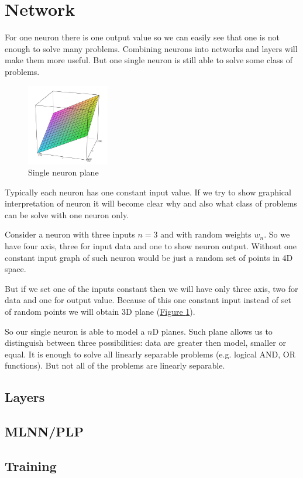 \section{Network}

For one neuron there is one output value so we can easily see that one is not enough to solve many problems. Combining neurons into networks and layers will make them more useful. But one single neuron is still able to solve some class of problems.

\begin{figure}
    \includegraphics[width=0.32\textwidth]{Media/Plane.png}
    \caption{Single neuron plane}
    \label{fig:SingleNeuronPlane}
\end{figure}

Typically each neuron has one constant input value. If we try to show graphical interpretation of neuron it will become clear why and also what class of problems can be solve with one neuron only.

Consider a neuron with three inputs $n = 3$ and with random weights $w_n$. So we have four axis, three for input data and one to show neuron output. Without one constant input graph of such neuron would be just a random set of points in 4D space.

But if we set one of the inputs constant then we will have only three axis, two for data and one for output value. Because of this one constant input instead of set of random points we will obtain 3D plane (\hyperref[fig:SingleNeuronPlane]{Figure \ref{fig:SingleNeuronPlane}}).

So our single neuron is able to model a $n$D planes. Such plane allows us to distinguish between three possibilities: data are greater then model, smaller or equal. It is enough to solve all linearly separable problems (e.g. logical AND, OR functions). But not all of the problems are linearly separable.


\subsection{Layers}

\subsection{MLNN/PLP}

\subsection{Training}